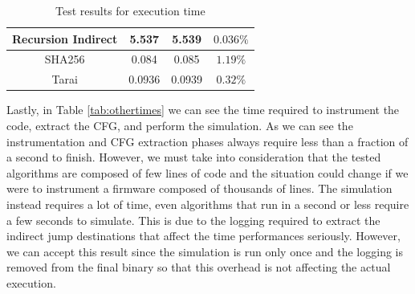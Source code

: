 \begin{table}
\begin{tabular}{|c|c|c|c|}
    \hline
    Recursion Indirect          & 5.537                        & 5.539                        & $0.036\%$              \\
    \hline
    SHA256                      & 0.084                        & 0.085                        & $1.19\%$               \\
    \hline
    Tarai                       & 0.0936                       & 0.0939                       & $0.32\%$               \\
    \hline
  \end{tabular}
  \caption{Test results for execution time}
  \label{tab:times}
\end{table}

Lastly, in Table \ref{tab:othertimes} we can see the time required to instrument
the code, extract the CFG, and perform the simulation. As we can see the instrumentation
and CFG extraction phases always require less than a fraction of a second to finish.
However, we must take into consideration that the tested algorithms are composed
of few lines of code and the situation could change if we were to instrument a firmware
composed of thousands of lines. The simulation instead requires a lot of time, even
algorithms that run in a second or less require a few seconds to simulate. This
is due to the logging required to extract the indirect jump destinations that
affect the time performances seriously. However, we can accept this result since
the simulation is run only once and the logging is removed from the final binary
so that this overhead is not affecting the actual execution.

